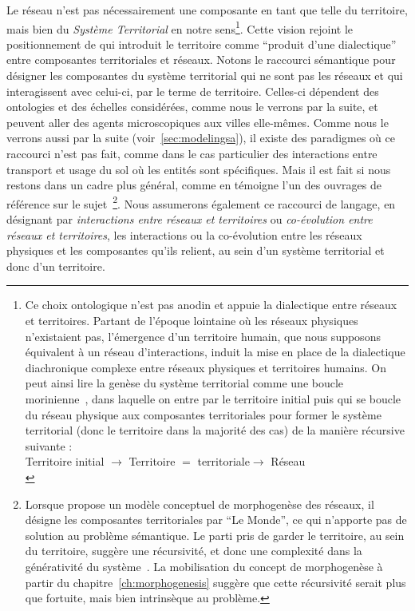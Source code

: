 {}{
Le réseau n'est pas nécessairement une composante en tant que telle du territoire, mais bien du \emph{Système Territorial} en notre sens\footnote{Ce choix ontologique n'est pas anodin et appuie la dialectique entre réseaux et territoires. Partant de l'époque lointaine où les réseaux physiques n'existaient pas, l'émergence d'un territoire humain, que nous supposons équivalent à un réseau d'interactions, induit la mise en place de la dialectique diachronique complexe entre réseaux physiques et territoires humains. On peut ainsi lire la genèse du système territorial comme une boucle morinienne~\cite{morin1976methode}, dans laquelle on entre par le territoire initial puis qui se boucle du réseau physique aux composantes territoriales pour former le système territorial (donc le territoire dans la majorité des cas) de la manière récursive suivante :\\Territoire initial $\rightarrow$ Territoire $=$  territoriale$\rightarrow$ Réseau \\}. Cette vision rejoint le positionnement de \cite{dupuy1985systemes} qui introduit le territoire comme ``produit d'une dialectique'' entre composantes territoriales et réseaux. Notons le raccourci sémantique pour désigner les composantes du système territorial qui ne sont pas les réseaux et qui interagissent avec celui-ci, par le terme de territoire. Celles-ci dépendent des ontologies et des échelles considérées, comme nous le verrons par la suite, et peuvent aller des agents microscopiques aux villes elle-mêmes. Comme nous le verrons aussi par la suite (voir~\ref{sec:modelingsa}), il existe des paradigmes où ce raccourci n'est pas fait, comme dans le cas particulier des interactions entre transport et usage du sol où les entités sont spécifiques. Mais il est fait si nous restons dans un cadre plus général, comme en témoigne l'un des ouvrages de référence sur le sujet~\cite{offner1996reseaux}\footnote{Lorsque \cite{amar1985essai} propose un modèle conceptuel de morphogenèse des réseaux, il désigne les composantes territoriales par ``Le Monde'', ce qui n'apporte pas de solution au problème sémantique. Le parti pris de garder le territoire, au sein du territoire, suggère une récursivité, et donc une complexité dans la générativité du système~\cite{morin1976methode}. La mobilisation du concept de morphogenèse à partir du chapitre~\ref{ch:morphogenesis} suggère que cette récursivité serait plus que fortuite, mais bien intrinsèque au problème.}. Nous assumerons également ce raccourci de langage, en désignant par \emph{interactions entre réseaux et territoires} ou \emph{co-évolution entre réseaux et territoires}, les interactions ou la co-évolution entre les réseaux physiques et les composantes qu'ils relient, au sein d'un système territorial et donc d'un territoire.
}




